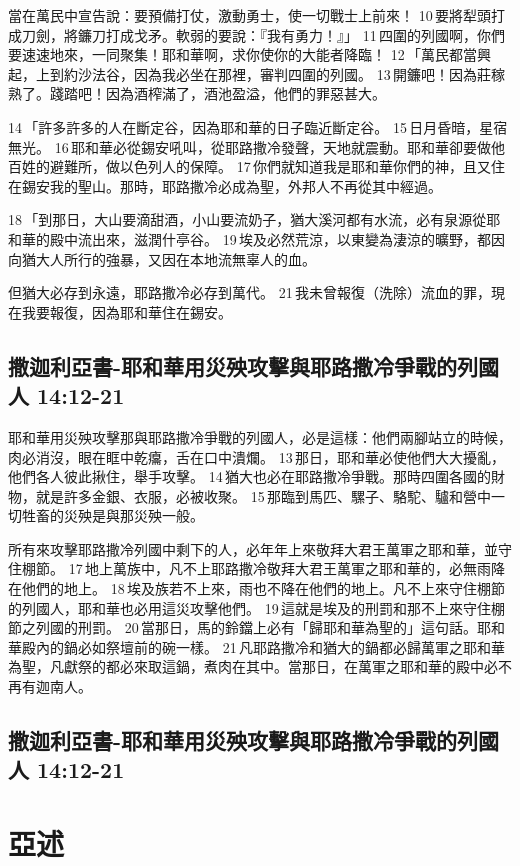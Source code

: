 當在萬民中宣告說：要預備打仗，激動勇士，使一切戰士上前來！ 10 要將犁頭打成刀劍，將鐮刀打成戈矛。軟弱的要說：『我有勇力！』」 11 四圍的列國啊，你們要速速地來，一同聚集！耶和華啊，求你使你的大能者降臨！ 12 「萬民都當興起，上到約沙法谷，因為我必坐在那裡，審判四圍的列國。 13 開鐮吧！因為莊稼熟了。踐踏吧！因為酒榨滿了，酒池盈溢，他們的罪惡甚大。

14 「許多許多的人在斷定谷，因為耶和華的日子臨近斷定谷。 15 日月昏暗，星宿無光。 16 耶和華必從錫安吼叫，從耶路撒冷發聲，天地就震動。耶和華卻要做他百姓的避難所，做以色列人的保障。 17 你們就知道我是耶和華你們的神，且又住在錫安我的聖山。那時，耶路撒冷必成為聖，外邦人不再從其中經過。

18 「到那日，大山要滴甜酒，小山要流奶子，猶大溪河都有水流，必有泉源從耶和華的殿中流出來，滋潤什亭谷。 19 埃及必然荒涼，以東變為淒涼的曠野，都因向猶大人所行的強暴，又因在本地流無辜人的血。

但猶大必存到永遠，耶路撒冷必存到萬代。 21 我未曾報復（洗除）流血的罪，現在我要報復，因為耶和華住在錫安。

\subsection{撒迦利亞書-耶和華用災殃攻擊與耶路撒冷爭戰的列國人 14:12-21}
耶和華用災殃攻擊那與耶路撒冷爭戰的列國人，必是這樣：他們兩腳站立的時候，肉必消沒，眼在眶中乾癟，舌在口中潰爛。 13 那日，耶和華必使他們大大擾亂，他們各人彼此揪住，舉手攻擊。 14 猶大也必在耶路撒冷爭戰。那時四圍各國的財物，就是許多金銀、衣服，必被收聚。 15 那臨到馬匹、騾子、駱駝、驢和營中一切牲畜的災殃是與那災殃一般。

所有來攻擊耶路撒冷列國中剩下的人，必年年上來敬拜大君王萬軍之耶和華，並守住棚節。 17 地上萬族中，凡不上耶路撒冷敬拜大君王萬軍之耶和華的，必無雨降在他們的地上。 18 埃及族若不上來，雨也不降在他們的地上。凡不上來守住棚節的列國人，耶和華也必用這災攻擊他們。 19 這就是埃及的刑罰和那不上來守住棚節之列國的刑罰。 20 當那日，馬的鈴鐺上必有「歸耶和華為聖的」這句話。耶和華殿內的鍋必如祭壇前的碗一樣。 21 凡耶路撒冷和猶大的鍋都必歸萬軍之耶和華為聖，凡獻祭的都必來取這鍋，煮肉在其中。當那日，在萬軍之耶和華的殿中必不再有迦南人。

\subsection{撒迦利亞書-耶和華用災殃攻擊與耶路撒冷爭戰的列國人 14:12-21}





\section{亞述}

